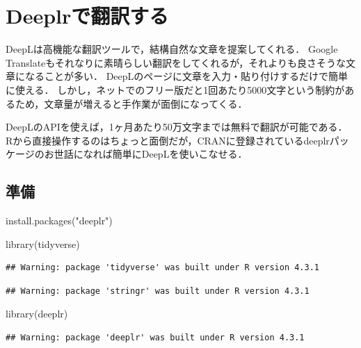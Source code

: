 \documentclass[
]{article}
\newenvironment{Shaded}{\begin{snugshade}}{\end{snugshade}}
\newcommand{\FunctionTok}[1]{\textcolor[rgb]{0.00,0.00,0.00}{#1}}
\newcommand{\NormalTok}[1]{#1}
\newcommand{\StringTok}[1]{\textcolor[rgb]{0.31,0.60,0.02}{#1}}
\begin{document}
\hypertarget{deeplr}{%
\section{Deeplrで翻訳する}\label{deeplr}}

DeepLは高機能な翻訳ツールで，結構自然な文章を提案してくれる．
Google Translateもそれなりに素晴らしい翻訳をしてくれるが，それよりも良さそうな文章になることが多い．
DeepLのページに文章を入力・貼り付けするだけで簡単に使える．
しかし，ネットでのフリー版だと1回あたり5000文字という制約があるため，文章量が増えると手作業が面倒になってくる．

DeepLのAPIを使えば，1ヶ月あたり50万文字までは無料で翻訳が可能である．
Rから直接操作するのはちょっと面倒だが，CRANに登録されているdeeplrパッケージのお世話になれば簡単にDeepLを使いこなせる．

\hypertarget{ux6e96ux5099-6}{%
\subsection{準備}\label{ux6e96ux5099-6}}

\begin{Shaded}
\begin{Highlighting}[]
\FunctionTok{install.packages}\NormalTok{(}\StringTok{"deeplr"}\NormalTok{)}
\end{Highlighting}
\end{Shaded}

\begin{Shaded}
\begin{Highlighting}[]
\FunctionTok{library}\NormalTok{(tidyverse)}
\end{Highlighting}
\end{Shaded}

\begin{verbatim}
## Warning: package 'tidyverse' was built under R version 4.3.1
\end{verbatim}

\begin{verbatim}
## Warning: package 'stringr' was built under R version 4.3.1
\end{verbatim}

\begin{Shaded}
\begin{Highlighting}[]
\FunctionTok{library}\NormalTok{(deeplr)}
\end{Highlighting}
\end{Shaded}

\begin{verbatim}
## Warning: package 'deeplr' was built under R version 4.3.1
\end{verbatim}
\end{document}
